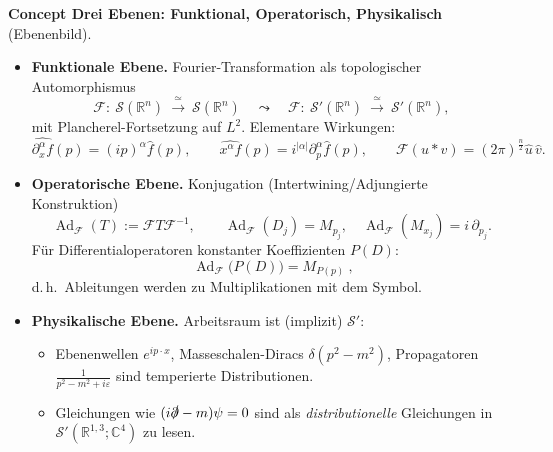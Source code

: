 \documentclass[10pt, letterpaper]{article}
\newcommand{\Ad}{\operatorname{Ad}}
\newcommand{\R}{\mathbb{R}}
\newcommand{\C}{\mathbb{C}}
\newcommand{\CustomHeading}[3]{%
  \par\medskip\noindent%
  \textbf{#1 #2} \textnormal{(#3)}.\enskip%
}
\newenvironment{CONC}[2]{\begin{unitbox}\CustomHeading{Concept}{#1}{#2}}{\end{unitbox}}
\begin{document}


\begin{CONC}{Drei Ebenen: Funktional, Operatorisch, Physikalisch}{Ebenenbild}
\begin{itemize}
\item \textbf{Funktionale Ebene.} Fourier-Transformation als topologischer Automorphismus
\[
\mathcal{F}:\ \mathcal{S}(\R^n)\ \xrightarrow{\ \simeq\ }\ \mathcal{S}(\R^n)
\quad\leadsto\quad
\mathcal{F}:\ \mathcal{S}'(\R^n)\ \xrightarrow{\ \simeq\ }\ \mathcal{S}'(\R^n),
\]
mit Plancherel-Fortsetzung auf $L^2$. Elementare Wirkungen:
\[
\widehat{\partial_x^\alpha f}(p)=(ip)^\alpha \hat f(p),\qquad
\widehat{x^\alpha f}(p)=i^{|\alpha|}\partial_p^\alpha\hat f(p),\qquad
\mathcal{F}(u*v)=(2\pi)^{\frac{n}{2}}\hat u\,\hat v.
\]

\item \textbf{Operatorische Ebene.} Konjugation (Intertwining/Adjungierte Konstruktion)
\[
\Ad_{\mathcal{F}}(T):=\mathcal{F}T\mathcal{F}^{-1},\qquad
\Ad_{\mathcal{F}}(D_j)=M_{p_j},\quad
\Ad_{\mathcal{F}}(M_{x_j})=i\,\partial_{p_j}.
\]
Für Differentialoperatoren konstanter Koeffizienten $P(D)$:
\[
\boxed{\ \Ad_{\mathcal{F}}\big(P(D)\big)=M_{P(p)}\ },
\]
d.\,h.\ Ableitungen werden zu Multiplikationen mit dem Symbol.

\item \textbf{Physikalische Ebene.} Arbeitsraum ist (implizit) $\mathcal{S}'$:
\begin{itemize}
\item Ebenenwellen $e^{ip\cdot x}$, Masseschalen-Diracs $\delta(p^2-m^2)$, Propagatoren $\tfrac{1}{p^2-m^2+i\varepsilon}$ sind temperierte Distributionen.
\item Gleichungen wie $(i\slashed{\partial}-m)\psi=0$ sind als \emph{distributionelle} Gleichungen in $\mathcal{S}'(\R^{1,3};\C^4)$ zu lesen.
\end{itemize}
\end{itemize}

\begin{center}
\end{center}
\end{CONC}
\end{document}
